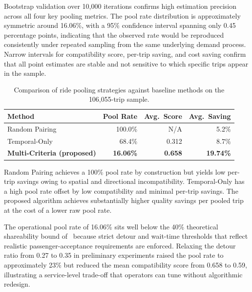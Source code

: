 \documentclass[a4paper,fleqn]{cas-dc}
\begin{document}
Bootstrap validation over 10{,}000 iterations confirms high estimation precision across all four key pooling metrics.  The pool rate distribution is approximately symmetric around 16.06\%, with a 95\% confidence interval spanning only 0.45 percentage points, indicating that the observed rate would be reproduced consistently under repeated sampling from the same underlying demand process.  Narrow intervals for compatibility score, per-trip saving, and cost saving confirm that all point estimates are stable and not sensitive to which specific trips appear in the sample.

\begin{table}[t]
\centering
\caption{Comparison of ride pooling strategies against baseline methods on the 106,055-trip sample.\label{tab:pooling_baseline}}
\begin{threeparttable}
\begin{tabularx}{\columnwidth}{>{\raggedright\arraybackslash}X r r r}
\toprule
\textbf{Method} & \textbf{Pool Rate} & \textbf{Avg.\ Score} & \textbf{Avg.\ Saving} \\
\toprule
Random Pairing & 100.0\% & N/A & 5.2\% \\
Temporal-Only & 68.4\% & 0.312 & 8.7\% \\
\textbf{Multi-Criteria (proposed)} & \textbf{16.06\%} & \textbf{0.658} & \textbf{19.74\%} \\
\bottomrule
\end{tabularx}
\begin{tablenotes}
  \small
  \item Random Pairing achieves a 100\% pool rate by construction but yields low per-trip savings owing to spatial and directional incompatibility.  Temporal-Only has a high pool rate offset by low compatibility and minimal per-trip savings.  The proposed algorithm achieves substantially higher quality savings per pooled trip at the cost of a lower raw pool rate.
\end{tablenotes}
\end{threeparttable}
\end{table}

The operational pool rate of 16.06\% sits well below the 40\% theoretical shareability bound of~\cite{santi2014quantifying} because strict detour and wait-time thresholds that reflect realistic passenger-acceptance requirements are enforced.  Relaxing the detour ratio from 0.27 to 0.35 in preliminary experiments raised the pool rate to approximately 23\% but reduced the mean compatibility score from 0.658 to 0.59, illustrating a service-level trade-off that operators can tune without algorithmic redesign.
\end{document}
